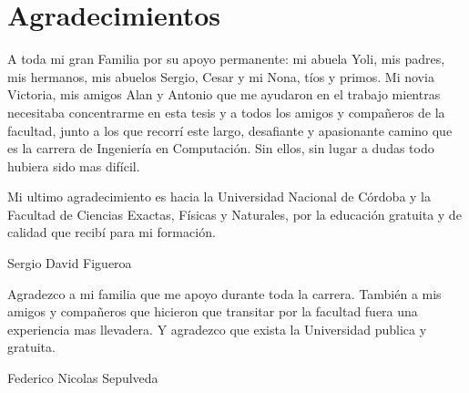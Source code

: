 \chapter*{\Large Agradecimientos}

A toda mi gran Familia por su apoyo permanente: mi abuela Yoli, mis padres, mis hermanos, mis abuelos Sergio, Cesar y mi Nona, tíos y primos. Mi novia Victoria, mis amigos Alan y Antonio que me ayudaron en el trabajo mientras necesitaba concentrarme en esta tesis y a todos los amigos y compañeros de la facultad, junto a los que recorrí este largo, desafiante y apasionante camino que es la carrera de Ingeniería en Computación. Sin ellos, sin lugar a dudas todo hubiera sido mas difícil. \par Mi ultimo agradecimiento es hacia la Universidad Nacional de Córdoba y la Facultad de Ciencias Exactas, Físicas y Naturales, por la educación gratuita y de calidad que recibí para mi formación.\par 
\begin{large} \begin{center}
         Sergio David Figueroa 
        \end{center}
        \end{large}

Agradezco a mi familia que me apoyo durante toda la carrera. También a mis amigos y compañeros que hicieron que transitar por la facultad fuera una experiencia mas llevadera. Y agradezco que exista la Universidad publica y gratuita. \par
\begin{large} \begin{center}
         Federico Nicolas Sepulveda 
        \end{center}
        \end{large}